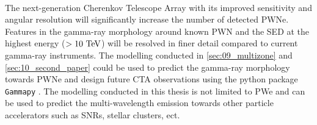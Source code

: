 \par~\par
The next-generation Cherenkov Telescope Array with its improved sensitivity and angular resolution \citep{2019scta.book.....C} will significantly increase the number of detected PWNe. Features in the gamma-ray morphology around known PWN and the SED at the highest energy ($>10~\TeV$) will be resolved in finer detail compared to current gamma-ray instruments. The modelling conducted in \autoref{sec:09_multizone} and \autoref{sec:10_second_paper} could be used to predict the gamma-ray morphology towards PWNe and design future CTA observations using the python package {\tt Gammapy} \citep{gammapy:2017}. The modelling conducted in this thesis is not limited to PWe and can be used to predict the multi-wavelength emission towards other particle accelerators such as SNRs, stellar clusters, ect.